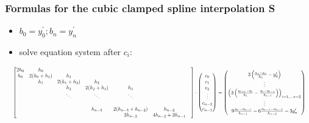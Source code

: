 \subsubsection{Formulas for the cubic \textbf{clamped} spline interpolation S}
\begin{itemize}
    \item $b_{0}=y_{0}^{\prime} ; b_{n}=y_{n}^{\prime}$
    \item solve equation system after $c_{i}$:
\end{itemize}
\begin{equation} 
\resizebox{1\textwidth}{!}{
    $\begin{bmatrix} 
        2h_0& h_0\\
        h_0 & 2(h_0+h_1) & h_1 &  &  &\\ 
        & h_1 & 2(h_1+h_2) & h_2 &  &\\ 
        &  & h_2 & 2(h_2+h_3) & h_3 & \\ 
        &  & \ddots & \ddots & \ddots & \\ 
        &  &  &  &  &  &  \\
        &  &  & h_{n-3} & 2(h_{n-3}+h_{n-2}) & h_{n-2} \\
        &  &  & & 2h_{n-2} & 4h_{n-2} + 3h_{n-1}
    \end{bmatrix}
    \cdot 
    \begin{pmatrix} 
        c_0\\ 
        c_1\\ 
        c_2\\
        \vdots\\
        c_{n-2}\\
        c_{n-1}
    \end{pmatrix} = 
    \begin{pmatrix} 
        3\left(\frac{a_1-a_0}{h_0}-y_0^{\prime}\right)\\ 
        \vdots\\ 
        \left(3\left(\frac{y_{i+1}-y_i}{h_i}-\frac{y_i-y_{i-1}}{h_{i-1}}\right)\right)_{i=1, \ldots n-2}\\ 
        \vdots\\ 
        9 \frac{y_n-a_{n-1}}{h_{n-1}}-6 \frac{a_{n-1}-a_{n-2}}{h_{n-2}}-3 y_n^{\prime}\\ 
    \end{pmatrix}$}
\end{equation}
